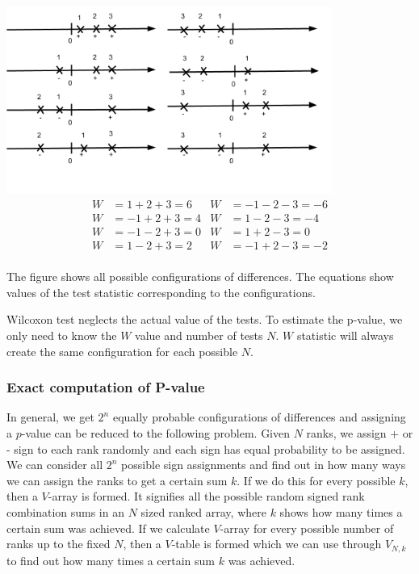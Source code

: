 \documentclass[12pt]{article}
\begin{document}
{\begin{table}
  \begin{center}
    \includegraphics[width=0.8\textwidth]{rankSignsExample}\\
    \begin{align*}
        W&= 1 + 2 + 3 = 6 & W&=-1 - 2 - 3 = -6\\
        W&= -1 + 2 + 3 = 4 & W&= 1 - 2 - 3 = -4\\
        W&= -1 - 2 + 3 = 0 & W&= 1 + 2 - 3 = 0\\
        W&= 1 - 2 + 3 = 2 & W&= -1 + 2 - 3 = -2\\
    \end{align*}
    \caption{The figure shows all possible configurations of differences. The equations show values of the test statistic corresponding to the configurations.}
    \label{table:adding_w_results}
  \end{center}
\end{table}

Wilcoxon test neglects the actual value of the tests. To estimate the p-value, we only need to know the $W$ value and number of tests $N$. $W$ statistic will always create the same configuration for each possible $N$.

\subsubsection{Exact computation of P-value}
\label{sec:exact_computation_of_p-value}
In general, we get $2^n$ equally probable configurations of differences and assigning a $p$-value can be reduced to the following problem. Given $N$ ranks, we assign + or - sign to each rank randomly and each sign has equal probability to be assigned. We can consider all $2^n$ possible sign assignments and find out in how many ways we can assign the ranks to get a certain sum $k$. If we do this for every possible $k$, then a $V$-array is formed. It signifies all the possible random signed rank combination sums in an $N$ sized ranked array, where $k$ shows how many times a certain sum was achieved. If we calculate $V$-array for every possible number of ranks up to the fixed $N$, then a $V$-table is formed which we can use through $V_{N, k}$ to find out how many times a certain sum $k$ was achieved.

}
\end{document}

